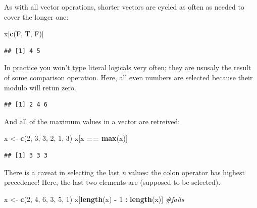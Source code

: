 \documentclass[]{book}
\newenvironment{Shaded}{\begin{snugshade}}{\end{snugshade}}
\newcommand{\CommentTok}[1]{\textcolor[rgb]{0.56,0.35,0.01}{\textit{#1}}}
\newcommand{\DecValTok}[1]{\textcolor[rgb]{0.00,0.00,0.81}{#1}}
\newcommand{\KeywordTok}[1]{\textcolor[rgb]{0.13,0.29,0.53}{\textbf{#1}}}
\newcommand{\NormalTok}[1]{#1}
\newcommand{\OperatorTok}[1]{\textcolor[rgb]{0.81,0.36,0.00}{\textbf{#1}}}
\newcommand{\StringTok}[1]{\textcolor[rgb]{0.31,0.60,0.02}{#1}}
\begin{document}
As with all vector operations, shorter vectors are cycled as often as needed to cover the longer one:

\begin{Shaded}
\begin{Highlighting}[]
\NormalTok{x[}\KeywordTok{c}\NormalTok{(F, T, F)]}
\end{Highlighting}
\end{Shaded}

\begin{verbatim}
## [1] 4 5
\end{verbatim}

In practice you won't type literal logicals very often; they are ususaly the result of some comparison operation. Here, all even numbers are selected because their modulo will retun zero.

\begin{Shaded}
\end{Shaded}

\begin{verbatim}
## [1] 2 4 6
\end{verbatim}

And all of the maximum values in a vector are retreived:

\begin{Shaded}
\begin{Highlighting}[]
\NormalTok{x <-}\StringTok{ }\KeywordTok{c}\NormalTok{(}\DecValTok{2}\NormalTok{, }\DecValTok{3}\NormalTok{, }\DecValTok{3}\NormalTok{, }\DecValTok{2}\NormalTok{, }\DecValTok{1}\NormalTok{, }\DecValTok{3}\NormalTok{)}
\NormalTok{x[x }\OperatorTok{==}\StringTok{ }\KeywordTok{max}\NormalTok{(x)]}
\end{Highlighting}
\end{Shaded}

\begin{verbatim}
## [1] 3 3 3
\end{verbatim}

There is a caveat in selecting the last \emph{n} values: the colon operator has highest precedence!
Here, the last two elements are (supposed to be selected).

\begin{Shaded}
\begin{Highlighting}[]
\NormalTok{x <-}\StringTok{ }\KeywordTok{c}\NormalTok{(}\DecValTok{2}\NormalTok{, }\DecValTok{4}\NormalTok{, }\DecValTok{6}\NormalTok{, }\DecValTok{3}\NormalTok{, }\DecValTok{5}\NormalTok{, }\DecValTok{1}\NormalTok{)}
\NormalTok{x[}\KeywordTok{length}\NormalTok{(x) }\OperatorTok{-}\StringTok{ }\DecValTok{1} \OperatorTok{:}\StringTok{ }\KeywordTok{length}\NormalTok{(x)] }\CommentTok{#fails}
\end{Highlighting}
\end{Shaded}
\end{document}
